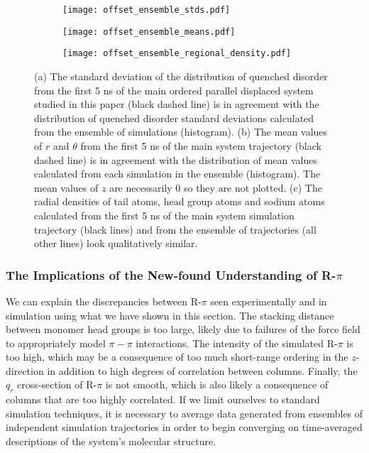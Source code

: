   \begin{figure}[!htb]
  \centering
  \begin{subfigure}{0.49\textwidth}
  \texttt{[image: offset\_ensemble\_stds.pdf]}
  \caption{}\label{fig:offset_ensemble_stds}
  \end{subfigure}
  \begin{subfigure}{0.49\textwidth}
  \texttt{[image: offset\_ensemble\_means.pdf]}
  \caption{}\label{fig:offset_ensemble_means}
  \end{subfigure}
  \begin{subfigure}{\textwidth}
  \texttt{[image: offset\_ensemble\_regional\_density.pdf]}
  \caption{}\label{fig:offset_ensemble_regional_density}
  \end{subfigure}
  \caption{(a) The standard deviation of the distribution of quenched disorder
  from the first 5 ns of the main ordered parallel displaced system studied in
  this paper (black dashed line) is in agreement with the distribution of quenched disorder 
  standard deviations calculated from the ensemble of simulations (histogram). 
  (b) The mean values of $r$ and $\theta$ from the first 5 ns of the main
  system trajectory (black dashed line) is in agreement with the distribution of mean values
  calculated from each simulation in the ensemble (histogram). The mean values of $z$
  are necessarily 0 so they are not plotted. (c) The radial densities of tail
  atoms, head group atoms and sodium atoms calculated from the first 5 ns of the
  main system simulation trajectory (black lines) and from the ensemble of 
  trajectories (all other lines) look qualitatively similar.}\label{fig:ensemble_stds}
  \end{figure}

  \subsubsection{The Implications of the New-found Understanding of R-$\pi$}

  We can explain the discrepancies between R-$\pi$ seen experimentally
  and in simulation using what we have shown in this section. The stacking
  distance between monomer head groups is too large, likely due to failures
  of the force field to appropriately model $\pi-\pi$ interactions. The intensity
  of the simulated R-$\pi$ is too high, which may be a consequence of too much short-range
  ordering in the $z$-direction in addition to high degrees of correlation 
  between columns. Finally, the $q_r$ cross-section of R-$\pi$ is not smooth, 
  which is also likely a consequence of columns that are too highly correlated.
  If we limit ourselves to standard simulation techniques, it is necessary to 
  average data generated from ensembles of independent simulation trajectories
  in order to begin converging on time-averaged descriptions of the system's
  molecular structure. 
  
